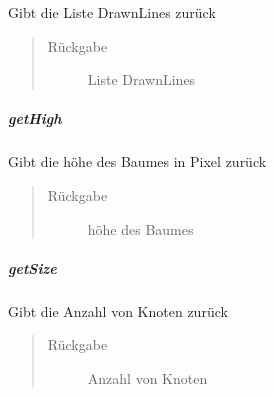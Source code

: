 \documentclass[letterpaper,10pt,ngerman]{sphinxmanual}
\begin{document}
\begin{fulllineitems}
\label{\detokenize{com/linuxluigi/edu/list/SinglyLinkedList:com.linuxluigi.edu.list.SinglyLinkedList.getDrawnLines()}}
Gibt die Liste DrawnLines zurück
\begin{quote}\begin{description}
\item[{Rückgabe}] \leavevmode
Liste DrawnLines

\end{description}\end{quote}

\end{fulllineitems}



\subparagraph{getHigh}
\label{\detokenize{com/linuxluigi/edu/list/SinglyLinkedList:gethigh}}

\begin{fulllineitems}
\label{\detokenize{com/linuxluigi/edu/list/SinglyLinkedList:com.linuxluigi.edu.list.SinglyLinkedList.getHigh()}}
Gibt die höhe des Baumes in Pixel zurück
\begin{quote}\begin{description}
\item[{Rückgabe}] \leavevmode
höhe des Baumes

\end{description}\end{quote}

\end{fulllineitems}



\subparagraph{getSize}
\label{\detokenize{com/linuxluigi/edu/list/SinglyLinkedList:getsize}}

\begin{fulllineitems}
\label{\detokenize{com/linuxluigi/edu/list/SinglyLinkedList:com.linuxluigi.edu.list.SinglyLinkedList.getSize()}}
Gibt die Anzahl von Knoten zurück
\begin{quote}\begin{description}
\item[{Rückgabe}] \leavevmode
Anzahl von Knoten

\end{description}\end{quote}

\end{fulllineitems}
\end{document}
